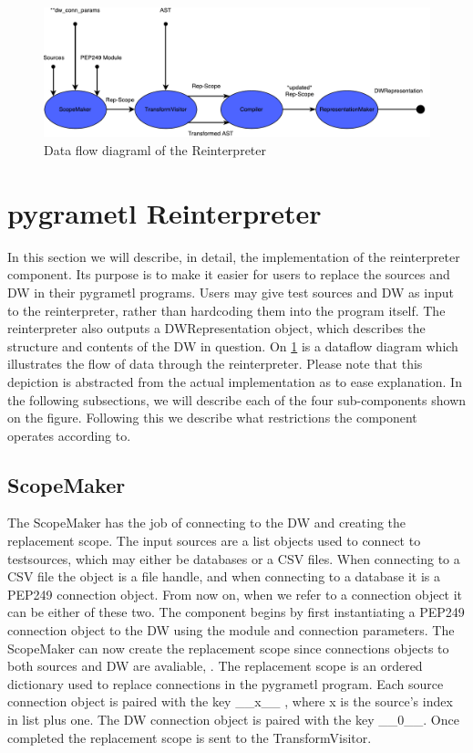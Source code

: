 \begin{figure}
  \centering
  \includegraphics[width=1\textwidth]{figures/reinterpreter.pdf}
  \caption{Data flow diagraml of the Reinterpreter}
  \label{fig:reinterpreter}
\end{figure}


\section{pygrametl Reinterpreter}


In this section we will describe, in detail, the implementation of the reinterpreter component. Its purpose is to make it easier for users to replace the sources and DW in their pygrametl programs. Users may give test sources and DW as input to the reinterpreter, rather than hardcoding them into the program itself. The reinterpreter also outputs a DWRepresentation object, which describes the structure and contents of the DW in question. On \cref{fig:reinterpreter} is a dataflow diagram which illustrates the flow of data through the reinterpreter. Please note that this depiction is abstracted from the actual implementation as to ease explanation. In the following subsections, we will describe each of the four sub-components shown on the figure. Following this we describe what restrictions the component operates according to.

\subsection{ScopeMaker}
The ScopeMaker has the job of connecting to the DW and creating the replacement scope.  The input sources are a list objects used to connect to testsources, which may either be databases or a CSV files. When connecting to a CSV file the object is a file handle, and when connecting to a database it is a PEP249 connection object. From now on, when we refer to a connection object it can be either of these two.  The component begins by first  instantiating a PEP249 connection object to the DW using the module and connection parameters. The ScopeMaker can now create the replacement scope since  connections objects to both sources and DW are avaliable, . The replacement scope is an ordered dictionary used to replace connections in the pygrametl program. Each source connection object is paired with the key \_\_x\_\_ , where x is the source's index in list plus one.  The DW connection object is paired with the key \_\_0\_\_. Once completed the replacement scope is sent to the TransformVisitor.  

